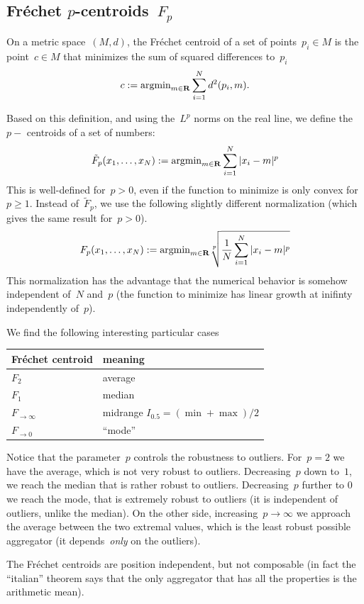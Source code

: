 \subsection{Fréchet $p$-centroids~$F_p$}

On a metric space~$(M,d)$, the Fréchet centroid of a set of
points~$p_i\in M$ is the point~$c\in M$ that minimizes the sum of
squared differences to~$p_i$
\[
	c := \mathrm{argmin}_{m\in\mathbf{R}}\sum_{i=1}^N d^2(p_i,m).
\]

Based on this definition, and using the~$L^p$ norms on the real line,
we define the~$p-$ centroids of a set of numbers:
\[
	\tilde F_p(x_1,\ldots,x_N) := \mathrm{argmin}_{m\in\mathbf{R}}\sum_{i=1}^N|x_i-m|^p
\]
This is well-defined for~$p>0$, even if the function to minimize is
only convex for~$p\ge1$.  Instead of~$\tilde F_p$, we use the
following slightly different normalization (which gives the same result for~$p>0$).
\[
	F_p(x_1,\ldots,x_N) :=
	\mathrm{argmin}_{m\in\mathbf{R}}\sqrt[p]{\frac{1}{N}\sum_{i=1}^N|x_i-m|^p}
\]
This normalization has the advantage that the numerical behavior is
somehow independent of~$N$ and~$p$  (the function to minimize has
linear growth at inifinty independently of~$p$).

We find the following interesting particular cases

\medskip

\begin{tabular}{l|l}
	Fréchet centroid & meaning \\
	\hline
	$F_2$ & average \\
	$F_1$ & median \\
	$F_{\to\infty}$ & midrange $I_{0.5}=(\min+\max)/2$ \\
	$F_{\to0}$ & ``mode'' \\
\end{tabular}

\medskip

Notice that the parameter~$p$ controls the robustness to outliers.
For~$p=2$ we have the average, which is not very robust to outliers.
Decreasing~$p$ down to~$1$, we reach the median that is rather robust
to outliers.  Decreasing~$p$ further to 0 we reach the mode, that is
extremely robust to outliers (it is independent of outliers, unlike
the median).  On the other side, increasing~$p\to\infty$ we approach
the average between the two extremal values, which is the least
robust possible aggregator (it depends~\emph{only} on the outliers).


The Fréchet centroids are position independent, but not composable
(in fact the ``italian'' theorem says that the only aggregator that
has all the properties is the arithmetic mean).

